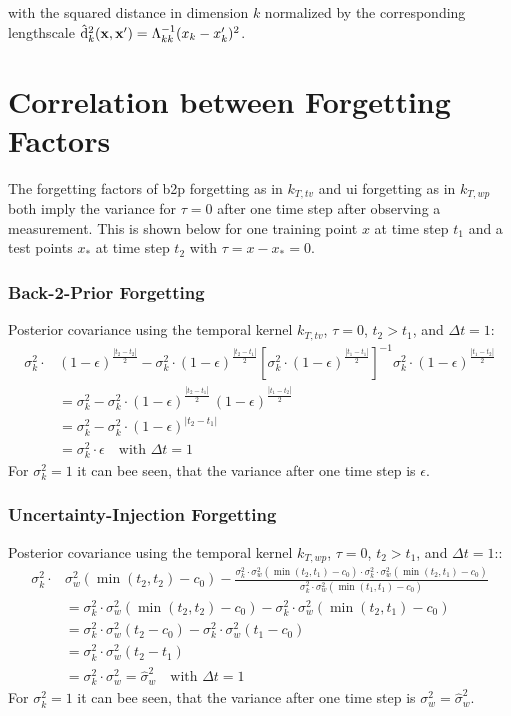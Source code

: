 with the squared distance in dimension $k$ normalized by the corresponding lengthscale $\hat{\mathrm{d}}_k^2(\mathrm{\mathbf{x}}, \mathrm{\mathbf{x}}') = \Lambda_{kk}^{-1} (x_{k} - x'_{k})^2$.


\section{Correlation between Forgetting Factors}
\label{apx:forgetting_factors}

The forgetting factors of \gls{b2p} forgetting as in $k_{T,tv}$ and \gls{ui} forgetting as in $k_{T,wp}$ both imply the variance for $\tau=0$ after one time step after observing a measurement. This is shown below for one training point $x$ at time step $t_1$ and a test points $x_*$ at time step $t_2$ with $\tau = x-x_* = 0$.

\subsubsection{Back-2-Prior Forgetting}

Posterior covariance using the temporal kernel $k_{T,tv}$, $\tau = 0$, $t_2>t_1$, and $\Delta t = 1$:
\begin{align}
    \sigma_k^2 \cdot &(1-\epsilon)^{\frac{|t_2-t_2|}{2}} - \sigma_k^2 \cdot (1-\epsilon)^{\frac{|t_2-t_1|}{2}} \left[ \sigma_k^2 \cdot (1-\epsilon)^{\frac{|t_1-t_1|}{2}} \right]^{-1} \sigma_k^2 \cdot (1-\epsilon)^{\frac{|t_1-t_2|}{2}} \\
    &=\sigma_k^2 - \sigma_k^2 \cdot (1-\epsilon)^{\frac{|t_2-t_1|}{2}} \,(1-\epsilon)^{\frac{|t_1-t_2|}{2}} \\
    &=\sigma_k^2 - \sigma_k^2 \cdot (1-\epsilon)^{|t_2-t_1|} \\
    &= \sigma_k^2 \cdot \epsilon  \quad \text{with } \Delta t = 1
\end{align}
For $\sigma_k^2 = 1$ it can bee seen, that the variance after one time step is $\epsilon$.

\subsubsection{Uncertainty-Injection Forgetting}

Posterior covariance using the temporal kernel $k_{T,wp}$, $\tau = 0$, $t_2>t_1$, and $\Delta t = 1$::
\begin{align}
    \sigma_k^2 \cdot &\sigma_w^2 (\min(t_2,t_2)-c_0)  - \frac{\sigma_k^2 \cdot \sigma_w^2 (\min(t_2,t_1)-c_0) \cdot\sigma_k^2 \cdot \sigma_w^2 (\min(t_2,t_1)-c_0)}{\sigma_k^2 \cdot \sigma_w^2 (\min(t_1,t_1)-c_0)}  \\
    &=\sigma_k^2 \cdot \sigma_w^2 (\min(t_2,t_2)-c_0) - \sigma_k^2 \cdot \sigma_w^2 (\min(t_2,t_1)-c_0) \\
    &=\sigma_k^2 \cdot \sigma_w^2 (t_2-c_0) - \sigma_k^2 \cdot \sigma_w^2 (t_1-c_0) \\
    &= \sigma_k^2 \cdot \sigma_w^2 (t_2-t_1) \\
    &= \sigma_k^2 \cdot \sigma_w^2 = \hat{\sigma}_w^2 \quad \text{with } \Delta t = 1
\end{align}
For $\sigma_k^2 = 1$ it can bee seen, that the variance after one time step is $\sigma_w^2 = \hat{\sigma}_w^2$.

